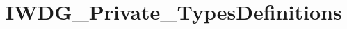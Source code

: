 \hypertarget{group___i_w_d_g___private___types_definitions}{}\section{I\+W\+D\+G\+\_\+\+Private\+\_\+\+Types\+Definitions}
\label{group___i_w_d_g___private___types_definitions}
